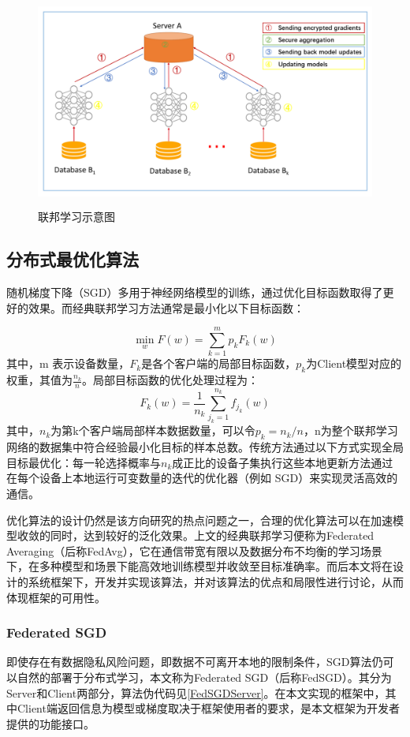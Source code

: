 \documentclass[zihao = -4,cn]{oucart}
\begin{document}
\begin{figure}[h]
	\centering %
	\includegraphics[width=12cm,height=7cm]{assets/fed}
	\caption{联邦学习示意图\cite{yang2019federated}}
	\label{fig:fed}
\end{figure}

\subsection{分布式最优化算法}
随机梯度下降（SGD）多用于神经网络模型的训练，通过优化目标函数取得了更好的效果。而经典联邦学习方法通常是最小化以下目标函数：\par
\begin{equation} \label{eqa:fed}
\min_{w} F(w) = \sum_{k=1}^{m}{p_k F_k(w)}
\end{equation}
其中，m 表示设备数量，$F_k$是各个客户端的局部目标函数，$p_k$为Client模型对应的权重，其值为$\frac{n_k}{n}$。局部目标函数的优化处理过程为：
\begin{equation}
F_k(w) = \frac{1}{n_k}\sum_{j_k=1}^{n_k}{f_{j_k}(w)}
\end{equation}
其中，$n_k$为第k个客户端局部样本数据数量，可以令$p_k=n_k/n$，n为整个联邦学习网络的数据集中符合经验最小化目标的样本总数。传统方法通过以下方式实现全局目标最优化：每一轮选择概率与$n_k$成正比的设备子集执行这些本地更新方法通过在每个设备上本地运行可变数量的迭代的优化器（例如 SGD）来实现灵活高效的通信。\par
优化算法的设计仍然是该方向研究的热点问题之一，合理的优化算法可以在加速模型收敛的同时，达到较好的泛化效果。上文的经典联邦学习便称为Federated Averaging（后称FedAvg）\cite{mcmahan2016communication}，它在通信带宽有限以及数据分布不均衡的学习场景下，在多种模型和场景下能高效地训练模型并收敛至目标准确率。而后本文将在设计的系统框架下，开发并实现该算法，并对该算法的优点和局限性进行讨论，从而体现框架的可用性。

\subsubsection{Federated SGD}
即使存在有数据隐私风险问题，即数据不可离开本地的限制条件，SGD算法仍可以自然的部署于分布式学习，本文称为Federated SGD（后称FedSGD）。其分为Server和Client两部分，算法伪代码见\ref{FedSGDServer}。在本文实现的框架中，其中Client端返回信息为模型或梯度取决于框架使用者的要求，是本文框架为开发者提供的功能接口。\par
\end{document}
